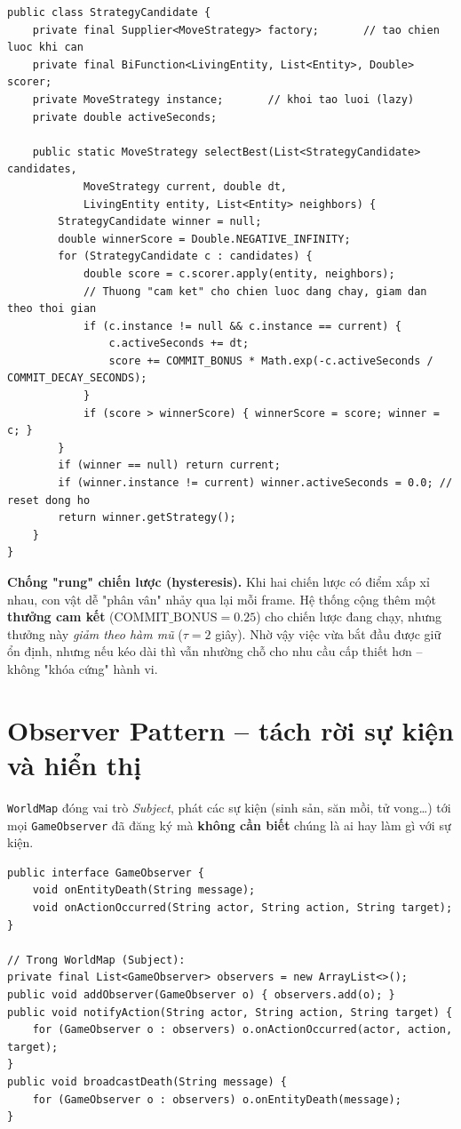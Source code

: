 \documentclass[12pt,a4paper]{report}
\newcommand{\code}[1]{\texttt{\small #1}}
\newcommand{\note}[1]{%
  \begin{mdframed}[backgroundcolor=infobg,linecolor=primaryblue,linewidth=0.8pt,
                   roundcorner=4pt,skipabove=6pt,skipbelow=6pt]#1\end{mdframed}}
\begin{document}
\begin{lstlisting}[caption={StrategyCandidate -- factory + scorer}]
public class StrategyCandidate {
    private final Supplier<MoveStrategy> factory;       // tao chien luoc khi can
    private final BiFunction<LivingEntity, List<Entity>, Double> scorer;
    private MoveStrategy instance;       // khoi tao luoi (lazy)
    private double activeSeconds;

    public static MoveStrategy selectBest(List<StrategyCandidate> candidates,
            MoveStrategy current, double dt,
            LivingEntity entity, List<Entity> neighbors) {
        StrategyCandidate winner = null;
        double winnerScore = Double.NEGATIVE_INFINITY;
        for (StrategyCandidate c : candidates) {
            double score = c.scorer.apply(entity, neighbors);
            // Thuong "cam ket" cho chien luoc dang chay, giam dan theo thoi gian
            if (c.instance != null && c.instance == current) {
                c.activeSeconds += dt;
                score += COMMIT_BONUS * Math.exp(-c.activeSeconds / COMMIT_DECAY_SECONDS);
            }
            if (score > winnerScore) { winnerScore = score; winner = c; }
        }
        if (winner == null) return current;
        if (winner.instance != current) winner.activeSeconds = 0.0; // reset dong ho
        return winner.getStrategy();
    }
}
\end{lstlisting}

\note{\textbf{Chống "rung" chiến lược (hysteresis).} Khi hai chiến lược có điểm xấp xỉ nhau, con vật dễ "phân vân" nhảy qua lại mỗi frame. Hệ thống cộng thêm một \textbf{thưởng cam kết} ($\text{COMMIT\_BONUS}=0.25$) cho chiến lược đang chạy, nhưng thưởng này \emph{giảm theo hàm mũ} ($\tau = 2$ giây). Nhờ vậy việc vừa bắt đầu được giữ ổn định, nhưng nếu kéo dài thì vẫn nhường chỗ cho nhu cầu cấp thiết hơn -- không "khóa cứng" hành vi.}

\section{Observer Pattern -- tách rời sự kiện và hiển thị}

\code{WorldMap} đóng vai trò \textit{Subject}, phát các sự kiện (sinh sản, săn mồi, tử vong\dots) tới mọi \code{GameObserver} đã đăng ký mà \textbf{không cần biết} chúng là ai hay làm gì với sự kiện.

\begin{lstlisting}[caption={GameObserver và cơ chế phát sự kiện}]
public interface GameObserver {
    void onEntityDeath(String message);
    void onActionOccurred(String actor, String action, String target);
}

// Trong WorldMap (Subject):
private final List<GameObserver> observers = new ArrayList<>();
public void addObserver(GameObserver o) { observers.add(o); }
public void notifyAction(String actor, String action, String target) {
    for (GameObserver o : observers) o.onActionOccurred(actor, action, target);
}
public void broadcastDeath(String message) {
    for (GameObserver o : observers) o.onEntityDeath(message);
}
\end{lstlisting}
\end{document}

